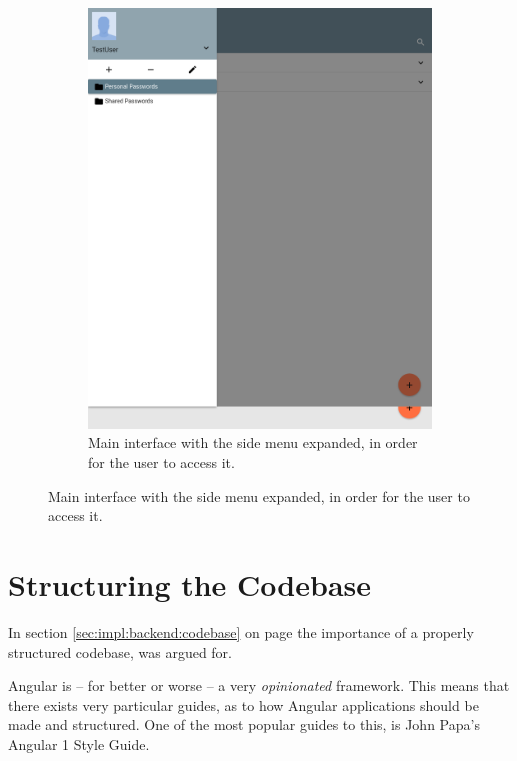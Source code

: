 \begin{figure}
			\begin{subfigure}[b]{0.75\textwidth}
				\includegraphics[width=\linewidth,clip,trim=0 800 200 0]{figures/implementation/screenshots/ghost_main_expanded_menu.png}
				\caption{Main interface with the side menu expanded, in order for the user to access it.}
				\label{fig:impl:responsive:expanded}
			\end{subfigure}

		\end{figure}

	\section{Structuring the Codebase}
		In section \ref{sec:impl:backend:codebase} on page \pageref{sec:impl:backend:codebase} the importance of a properly structured codebase, was argued for. 

		Angular is -- for better or worse -- a very \emph{opinionated} framework. This means that there exists very particular guides, as to how Angular applications should be made and structured. One of the most popular guides to this, is John Papa's Angular 1 Style Guide\cite{johnpapa_angular1}.

